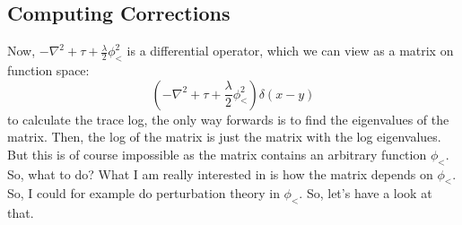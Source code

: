 \subsection{Computing Corrections}
Now, $-\nabla^2 + \tau + \frac{\lambda}{2}\phi_<^2$ is a differential operator, which we can view as a matrix on function space:
\begin{equation}
    (-\nabla^2 + \tau + \frac{\lambda}{2}\phi_<^2)\delta(x-y)
\end{equation}
to calculate the trace log, the only way forwards is to find the eigenvalues of the matrix. Then, the log of the matrix is just the matrix with the log eigenvalues. But this is of course impossible as the matrix contains an arbitrary function $\phi_<$. So, what to do? What I am really interested in is how the matrix depends on $\phi_<$. So, I could for example do perturbation theory in $\phi_<$. So, let's have a look at that.

